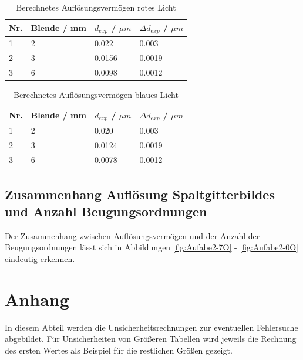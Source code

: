 \documentclass[12pt,a4paper,twoside]{article}
\begin{document}
\begin{table}[H]
    \centering
    \caption{Berechnetes Auflösungsvermögen rotes Licht}
    \label{tab:BerechneteAVrot}
    \begin{tabular}{| l | l | l | l |}
        \hline
        Nr. & Blende / mm & $d_{exp}$ / $\mu m$ & $\Delta d_{exp}$ / $\mu m$ \\
        \hline
        1 & 2 & 0.022  & 0.003  \\
        2 & 3 & 0.0156 & 0.0019 \\
        3 & 6 & 0.0098 & 0.0012 \\
        \hline
    \end{tabular}
\end{table}

\begin{table}[H]
    \centering
    \caption{Berechnetes Auflösungsvermögen blaues Licht}
    \label{tab:BerechneteAVblau}
    \begin{tabular}{| l | l | l | l |}
        \hline
        Nr. & Blende / mm & $d_{exp}$ / $\mu m$ & $\Delta d_{exp}$ / $\mu m$ \\
        \hline
        1 & 2 & 0.020  & 0.003  \\
        2 & 3 & 0.0124 & 0.0019 \\
        3 & 6 & 0.0078 & 0.0012 \\
        \hline
    \end{tabular}
\end{table}


\subsection{Zusammenhang Auflösung Spaltgitterbildes und Anzahl Beugungsordnungen}

Der Zusammenhang zwischen Auflösungsvermögen und der Anzahl der Beugungsordnungen lässt sich in Abbildungen \ref{fig:Aufabe2-7O} - \ref{fig:Aufabe2-0O} eindeutig erkennen.



\newpage
\section{Anhang}

In diesem Abteil werden die Unsicherheitsrechnungen zur eventuellen Fehlersuche abgebildet. Für Unsicherheiten von Größeren Tabellen wird jeweils die Rechnung des ersten Wertes als Beispiel für die restlichen Größen gezeigt.
\end{document}
